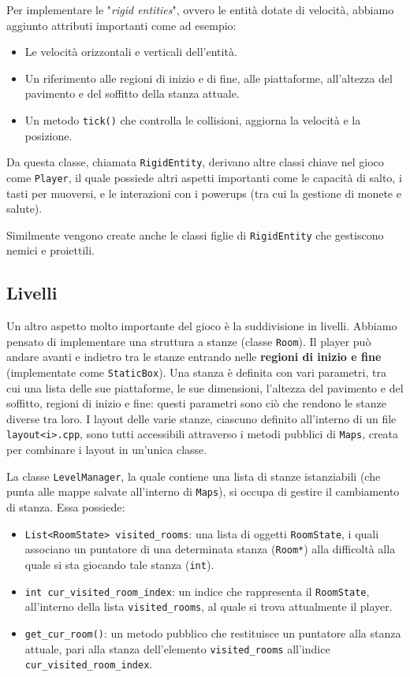 \documentclass[a4paper,12pt]{article}
\begin{document}
Per implementare le "\textit{rigid entities}", ovvero le entità dotate di velocità, abbiamo aggiunto attributi importanti come ad esempio:
\begin{itemize}
\item Le velocità orizzontali e verticali dell'entità.
\item Un riferimento alle regioni di inizio e di fine, alle piattaforme, all'altezza del pavimento e del soffitto della stanza attuale.
\item Un metodo \texttt{tick()} che controlla le collisioni, aggiorna la velocità e la posizione.
\end{itemize}

Da questa classe, chiamata \texttt{RigidEntity}, derivano altre classi chiave nel gioco come \texttt{Player}, il quale possiede altri aspetti importanti come le capacità di salto, i tasti per muoversi, e le interazioni con i powerups (tra cui la gestione di monete e salute).

Similmente vengono create anche le classi figlie di \texttt{RigidEntity} che gestiscono nemici e proiettili.

\subsection{Livelli}
Un altro aspetto molto importante del gioco è la suddivisione in livelli. Abbiamo pensato di implementare una struttura a stanze (classe \texttt{Room}). Il player può andare avanti e indietro tra le stanze entrando nelle \textbf{regioni di inizio e fine} (implementate come \texttt{StaticBox}). Una stanza è definita con vari parametri, tra cui una lista delle sue piattaforme, le sue dimensioni, l'altezza del pavimento e del soffitto, regioni di inizio e fine: questi parametri sono ciò che rendono le stanze diverse tra loro.
I layout delle varie stanze, ciascuno definito all'interno di un file \texttt{layout<i>.cpp}, sono tutti accessibili attraverso i metodi pubblici di \texttt{Maps}, creata per combinare i layout in un'unica classe.

La classe \texttt{LevelManager}, la quale contiene una lista di stanze istanziabili (che punta alle mappe salvate all'interno di \texttt{Maps}), si occupa di gestire il cambiamento di stanza. Essa possiede: 
\begin{itemize}
\item \texttt{List<RoomState> visited\_rooms}: una lista di oggetti \texttt{RoomState}, i quali associano un puntatore di una determinata stanza (\texttt{Room*}) alla difficoltà alla quale si sta giocando tale stanza (\texttt{int}).
\item \texttt{int cur\_visited\_room\_index}: un indice che rappresenta il \texttt{RoomState}, all'interno della lista \texttt{visited\_rooms}, al quale si trova attualmente il player.
\item \texttt{get\_cur\_room()}: un metodo pubblico che restituisce un puntatore alla stanza attuale, pari alla stanza dell'elemento \texttt{visited\_rooms} all'indice \texttt{cur\_visited\_room\_index}.
\end{itemize} 
\end{document}
